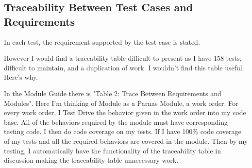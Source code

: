 \documentclass[12pt, titlepage]{article}
\begin{document}
% 
% 
% 
% 		
% 
% 
% 
% 					
% 					
% 					
% 					
% 					
% 
% 					
% 					
% 					
% 					
% 
% 
% 

\subsection{Traceability Between Test Cases and Requirements}

In each test, the requirement supported by the test case is stated.

However I would find a traceability table difficult to present as I have 158 tests, difficult to maintain, and a duplication of work. I wouldn't find this table useful. Here's why.

In the Module Guide there is "Table 2: Trace Between Requirements and Modules". Here I'm thinking of Module as a Parnas Module, a work order. For every work order, I Test Drive the behavior given in the work order into my code base. All of the behaviors required by the module must have corresponding testing code. I then do code coverage on my tests. If I have 100\% code coverage of my tests and all the required behaviors are covered in the module. Then by my testing, I automatically have the functionality of the traceability table in discussion making the traceability table unnecessary work.
\end{document}
